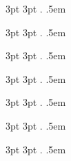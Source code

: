   {3pt} %
  {3pt} %
  {} %
  {} %
  {\bfseries} %
  {.} %
  {.5em} %
  {} %

  {3pt} %
  {3pt} %
  {} %
  {} %
  {\bfseries} %
  {.} %
  {.5em} %
  {} %

  {3pt} %
  {3pt} %
  {} %
  {} %
  {\bfseries} %
  {.} %
  {.5em} %
  {} %

  {3pt} %
  {3pt} %
  {} %
  {} %
  {\bfseries} %
  {.} %
  {.5em} %
  {} %

  {3pt} %
  {3pt} %
  {} %
  {} %
  {\bfseries} %
  {.} %
  {.5em} %
  {} %

  {3pt} %
  {3pt} %
  {} %
  {} %
  {\bfseries} %
  {.} %
  {.5em} %
  {} %


  {3pt} %
  {3pt} %
  {} %
  {} %
  {\bfseries} %
  {.} %
  {.5em} %
  {} %



\theoremstyle{mythmstyle}
\newtheorem{theorem}{Теорема}

